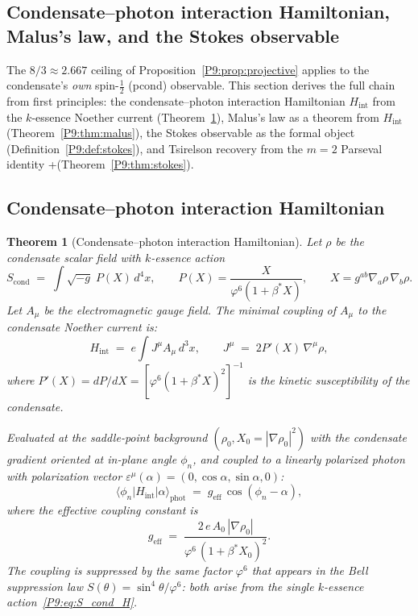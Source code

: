 \documentclass[11pt,a4paper]{article}
\newtheorem{theorem}{Theorem}[section]
\theoremstyle{definition}
\theoremstyle{remark}
\newcommand{\vp}{\varphi}
\newcommand{\bst}{\beta^{*}}
\begin{document}
\subsection{Condensate--photon interaction Hamiltonian, Malus's law, and the Stokes observable}
\label{P9:sec:stokes_derivation}
 
The $8/3\approx2.667$ ceiling of Proposition~\ref{P9:prop:projective} applies
to the condensate's \emph{own} spin-$\tfrac{1}{2}$ (pcond) observable.
This section derives the full chain from first principles:
the condensate--photon interaction Hamiltonian $H_\mathrm{int}$ from the
$k$-essence Noether current (Theorem~\ref{P9:thm:H_int}),
Malus's law as a theorem from $H_\mathrm{int}$ (Theorem~\ref{P9:thm:malus}),
the Stokes observable as the formal object (Definition~\ref{P9:def:stokes}),
and Tsirelson recovery from the $m=2$ Parseval identity
+(Theorem~\ref{P9:thm:stokes}).

\subsection{Condensate--photon interaction Hamiltonian}
\label{P9:sec:H_int}

\begin{theorem}[Condensate--photon interaction Hamiltonian]
\label{P9:thm:H_int}
Let $\rho$ be the condensate scalar field with $k$-essence action
\begin{equation}
  S_\mathrm{cond}
  \;=\; \int\!\sqrt{-g}\;P(X)\,d^4x,
  \qquad
  P(X) = \frac{X}{\vp^6(1+\bst X)},
  \qquad
  X = g^{ab}\nabla_{\!a}\rho\,\nabla_{\!b}\rho.
  \label{P9:eq:S_cond_H}
\end{equation}
Let $A_\mu$ be the electromagnetic gauge field.
The minimal coupling of $A_\mu$ to the condensate Noether current is:
\begin{equation}
  H_\mathrm{int}
  \;=\; e\int J^\mu A_\mu\,d^3x,
  \qquad
  J^\mu \;=\; 2P'(X)\,\nabla^\mu\rho,
  \label{P9:eq:H_int}
\end{equation}
where $P'(X) = dP/dX = [\vp^6(1+\bst X)^2]^{-1}$ is the kinetic
susceptibility of the condensate.

Evaluated at the saddle-point background $(\rho_0, X_0=|\nabla\rho_0|^2)$
with the condensate gradient oriented at in-plane angle $\phi_n$, and
coupled to a linearly polarized photon with polarization vector
$\varepsilon^\mu(\alpha) = (0,\cos\alpha,\sin\alpha,0)$:
\begin{equation}
  \langle\phi_n|H_\mathrm{int}|\alpha\rangle_\mathrm{phot}
  \;=\; g_\mathrm{eff}\,\cos(\phi_n - \alpha),
  \label{P9:eq:H_int_matrix}
\end{equation}
where the effective coupling constant is
\begin{equation}
  g_\mathrm{eff}
  \;=\; \frac{2\,e\,A_0\,|\nabla\rho_0|}{\vp^6\,(1+\bst X_0)^2}.
  \label{P9:eq:g_eff}
\end{equation}
The coupling is suppressed by the same factor $\vp^6$ that appears in the
Bell suppression law $S(\theta)=\sin^4\theta/\vp^6$:
both arise from the single $k$-essence action~\eqref{P9:eq:S_cond_H}.
\end{theorem}
\end{document}
